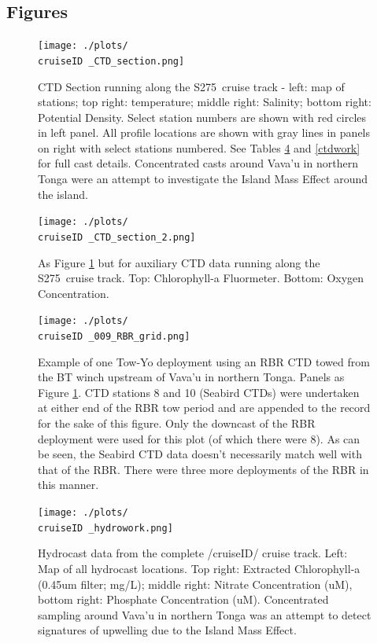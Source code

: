 \documentclass[letterpaper,11pt]{article}
\newcommand{\cruiseID}{S275}
\begin{document}
\clearpage
\subsection*{Figures}

\begin{figure}[h]
\centering
\texttt{[image: ./plots/\\cruiseID \_CTD\_section.png]}
\caption[CTD Section running along the \cruiseID\ cruise track]{CTD Section running along the \cruiseID\ cruise track - left: map of stations; top right: temperature; middle right: Salinity; bottom right: Potential Density. Select station numbers are shown with red circles in left panel. All profile locations are shown with gray lines in panels on right with select stations numbered. See Tables \ref{hydrowork} and \ref{ctdwork} for full cast details. Concentrated casts around Vava'u in northern Tonga were an attempt to investigate the Island Mass Effect around the island.}
\label{CTD_section}
\end{figure}

\begin{figure}[ht]
\centering
\texttt{[image: ./plots/\\cruiseID \_CTD\_section\_2.png]}
\caption[Auxiliary CTD data running along the \cruiseID\ cruise track]{As Figure \ref{CTD_section} but for auxiliary CTD data running along the \cruiseID\ cruise track. Top: Chlorophyll-a Fluormeter. Bottom: Oxygen Concentration.}
\label{CTD_section_2}
\end{figure}

\begin{figure}[ht]
\centering
\texttt{[image: ./plots/\\cruiseID \_009\_RBR\_grid.png]}
\caption[CTD data from RBR Tow-Yo]{Example of one Tow-Yo deployment using an RBR CTD towed from the BT winch upstream of Vava'u in northern Tonga. Panels as Figure \ref{CTD_section}. CTD stations 8 and 10 (Seabird CTDs) were undertaken at either end of the RBR tow period and are appended to the record for the sake of this figure. Only the downcast of the RBR deployment were used for this plot (of which there were 8). As can be seen, the Seabird CTD data doesn't necessarily match well with that of the RBR. There were three more deployments of the RBR in this manner.}
\label{CTD_RBR}
\end{figure}


\begin{figure}[t]
\centering
\texttt{[image: ./plots/\\cruiseID \_hydrowork.png]}
\caption[Hydrocast summary along \cruiseID\ cruise track]{Hydrocast data from the complete /cruiseID/ cruise track. Left: Map of all hydrocast locations. Top right: Extracted Chlorophyll-a (0.45um filter; mg/L); middle right: Nitrate Concentration (uM), bottom right: Phosphate Concentration (uM). Concentrated sampling around Vava'u in northern Tonga was an attempt to detect signatures of upwelling due to the Island Mass Effect.}
\label{hydrowork}
\end{figure}
\end{document}
